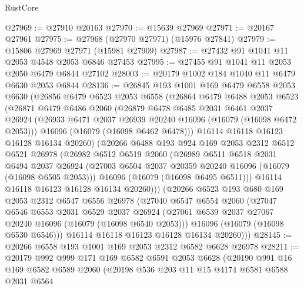 \begin{lexlean}{RustCore}
\begin{coremodule}
@27969 := @27910 @20163
@27970 := @15639 @27969
@27971 := @20167 @27961
@27975 := @27968 (@27970 @27971) (@15976 @27841)
@27979 := @15806 @27969 @27971 (@15981 @27909)
@27987 := @27432 @91 @1041 @11 @2053 @4548 @2053 @6846 @27453
@27995 := @27455 @91 @1041 @11 @2053 @2050 @6479 @6844 @27102
@28003 := @20179 @1002 @184 @1040 @11 @6479 @6630 @2053 @6844
@28136 := @26845
    @193
    @1001
    @169
    @6479
    @6558
    @2053
    @6630
    (@26856
      @6479
      @6523
      @2053
      @6558
      (@26864
        @6479
        @6488
        @2053
        @6523
        (@26871
          @6479
          @6486
          @2060
          (@26879
            @6478
            @6485
            @2031
            @6461
            @2037
            @26924
            (@26933 @6471 @2037 @26939 @20240 @16096 (@16079 (@16098 @6472 @2053)))
            @16096
            (@16079 (@16098 @6462 @6478)))
          @16114
          @16118
          @16123
          @16128
          @16134
          @20260)
        (@20266
          @6488
          @193
          @924
          @169
          @2053
          @2312
          @6512
          @6521
          @26978
          (@26982
            @6512
            @6519
            @2060
            (@26989
              @6511
              @6518
              @2031
              @6494
              @2037
              @26924
              (@27003 @6504 @2037 @20359 @20240 @16096 (@16079 (@16098 @6505 @2053)))
              @16096
              (@16079 (@16098 @6495 @6511)))
            @16114
            @16118
            @16123
            @16128
            @16134
            @20260)))
      (@20266
        @6523
        @193
        @680
        @169
        @2053
        @2312
        @6547
        @6556
        @26978
        (@27040
          @6547
          @6554
          @2060
          (@27047
            @6546
            @6553
            @2031
            @6529
            @2037
            @26924
            (@27061 @6539 @2037 @27067 @20240 @16096 (@16079 (@16098 @6540 @2053)))
            @16096
            (@16079 (@16098 @6530 @6546)))
          @16114
          @16118
          @16123
          @16128
          @16134
          @20260)))
@28145 := @20266 @6558 @193 @1001 @169 @2053 @2312 @6582 @6628 @26978
@28211 := @20179
    @992
    @999
    @171
    @169
    @6582
    @6591
    @2053
    @6628
    (@20190
      @991
      @16
      @169
      @6582
      @6589
      @2060
      (@20198
        @536
        @203
        @11
        @15
        @4174
        @6581
        @6588
        @2031
        @6564

\end{coremodule}
\end{lexlean}
